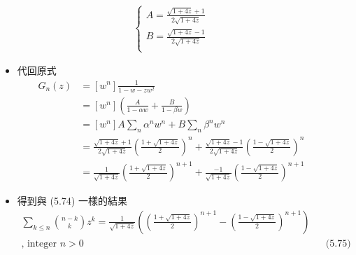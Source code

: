 \documentclass[11pt,fleqn]{article}
\begin{document}
\begin{description}
\begin{itemize}
\begin{align*}
\left\{\begin{matrix}
A = \frac{\sqrt{1+4z}+1}{2\sqrt{1+4z}} \\
B = \frac{\sqrt{1+4z}-1}{2\sqrt{1+4z}} \\
\end{matrix}\right.
		\end{align*}
			\item 代回原式
		\begin{align*}
			G_n(z) &= [w^n] \frac{1}{1-w-zw^2} \\
				&= [w^n] \left( \frac{A}{1-\alpha w} + \frac{B}{1-\beta w} \right) \\
				&= [w^n] A \sum_{n} \alpha^n w^n + B \sum_{n} \beta^n w^n \\
				&= \frac{\sqrt{1+4z}+1}{2\sqrt{1+4z}}\left(\frac{1+\sqrt{1+4z}}{2}\right)^n +
					\frac{\sqrt{1+4z}-1}{2\sqrt{1+4z}}\left(\frac{1-\sqrt{1+4z}}{2}\right)^n \\
				&= \frac{1}{\sqrt{1+4z}}\left(\frac{1+\sqrt{1+4z}}{2}\right)^{n+1} +
					\frac{-1}{\sqrt{1+4z}}\left(\frac{1-\sqrt{1+4z}}{2}\right)^{n+1}
		\end{align*}
			\item 得到與 (5.74) 一樣的結果
		\begin{align*}
			\sum_{k \le n} \binom{n-k}{k} z^k = 
				\frac{1}{\sqrt{1+4z}}\left(\left(\frac{1+\sqrt{1+4z}}{2}\right)^{n+1}
					- \left(\frac{1-\sqrt{1+4z}}{2}\right)^{n+1} \right) \\
					\text{, integer } n > 0 && \text{(5.75)}
		\end{align*}
	\end{itemize}
\end{description}
\end{document}
